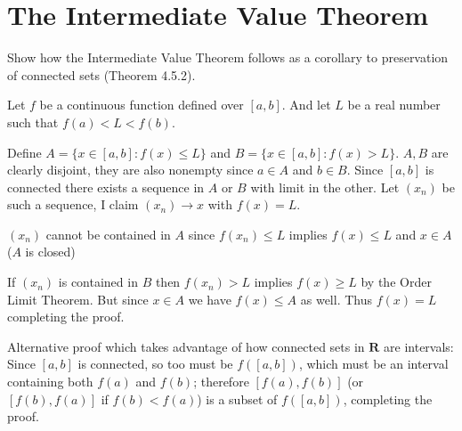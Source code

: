 \section{The Intermediate Value Theorem}

\begin{exercise}
  Show how the Intermediate Value Theorem follows as a corollary to preservation of connected sets (Theorem 4.5.2).
\end{exercise}
\begin{solution}
  Let $f$ be a continuous function defined over $[a,b]$. And let $L$ be a real number such that $f(a) < L < f(b)$.

  Define $A = \{x \in [a,b] : f(x) \le L\}$ and $B = \{x \in [a,b] : f(x) > L\}$. $A,B$ are clearly disjoint, they are also nonempty since $a \in A$ and $b \in B$. Since $[a,b]$ is connected there exists a sequence in $A$ or $B$ with limit in the other. Let $(x_n)$ be such a sequence, I claim $(x_n) \to x$ with $f(x) = L$.

  $(x_n)$ cannot be contained in $A$ since $f(x_n) \le L$ implies $f(x) \le L$ and $x \in A$ ($A$ is closed)

  If $(x_n)$ is contained in $B$ then $f(x_n) > L$ implies $f(x) \ge L$ by the Order Limit Theorem. But since $x \in A$ we have $f(x) \le A$ as well. Thus $f(x) = L$ completing the proof.

  Alternative proof which takes advantage of how connected sets in \(\mathbf{R}\) are intervals: Since \([a, b]\) is connected, so too must be \(f([a, b])\), which must be an interval containing both \(f(a)\) and \(f(b)\); therefore \([f(a), f(b)]\) (or \([f(b), f(a)]\) if \(f(b) < f(a)\)) is a subset of \(f([a, b])\), completing the proof.

\end{solution}

